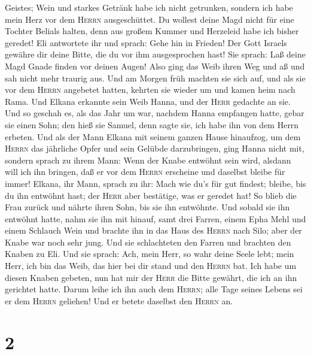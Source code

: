Geistes; Wein und starkes Getränk habe ich nicht getrunken, sondern ich
habe mein Herz vor dem \textsc{Herrn} ausgeschüttet.  Du
wollest deine Magd nicht für eine Tochter Belials halten, denn aus
großem Kummer und Herzeleid habe ich bisher geredet!  Eli
antwortete ihr und sprach: Gehe hin in Frieden! Der Gott Israels gewähre
dir deine Bitte, die du vor ihm ausgesprochen hast!  Sie
sprach: Laß deine Magd Gnade finden vor deinen Augen! Also ging das Weib
ihren Weg und aß und sah nicht mehr traurig aus.  Und am
Morgen früh machten sie sich auf, und als sie vor dem \textsc{Herrn}
angebetet hatten, kehrten sie wieder um und kamen heim nach Rama. Und
Elkana erkannte sein Weib Hanna, und der \textsc{Herr} gedachte an sie.
 Und so geschah es, als das Jahr um war, nachdem Hanna
empfangen hatte, gebar sie einen Sohn; den hieß sie Samuel, denn sagte
sie, ich habe ihn von dem Herrn erbeten.  Und als der
Mann Elkana mit seinem ganzen Hause hinaufzog, um dem \textsc{Herrn} das
jährliche Opfer und sein Gelübde darzubringen,  ging
Hanna nicht mit, sondern sprach zu ihrem Mann: Wenn der Knabe entwöhnt
sein wird, alsdann will ich ihn bringen, daß er vor dem \textsc{Herrn}
erscheine und daselbst bleibe für immer!  Elkana, ihr
Mann, sprach zu ihr: Mach wie du's für gut findest; bleibe, bis du ihn
entwöhnt hast; der \textsc{Herr} aber bestätige, was er geredet hat! So
blieb die Frau zurück und nährte ihren Sohn, bis sie ihn entwöhnte.
 Und sobald sie ihn entwöhnt hatte, nahm sie ihn mit
hinauf, samt drei Farren, einem Epha Mehl und einem Schlauch Wein und
brachte ihn in das Haus des \textsc{Herrn} nach Silo; aber der Knabe war
noch sehr jung.  Und sie schlachteten den Farren und
brachten den Knaben zu Eli.  Und sie sprach: Ach, mein
Herr, so wahr deine Seele lebt; mein Herr, ich bin das Weib, das hier
bei dir stand und den \textsc{Herrn} bat.  Ich habe um
diesen Knaben gebeten, nun hat mir der \textsc{Herr} die Bitte gewährt,
die ich an ihn gerichtet hatte.  Darum leihe ich ihn auch
dem \textsc{Herrn}; alle Tage seines Lebens sei er dem \textsc{Herrn}
geliehen! Und er betete daselbst den \textsc{Herrn} an.

\hypertarget{section-1}{%
\section{2}\label{section-1}}

